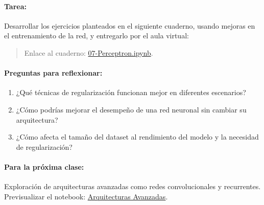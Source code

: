 \documentclass[a4,11pt]{aleph-notas}
\begin{document}
\paragraph{Tarea:}  
    Desarrollar los ejercicios planteados en el siguiente cuaderno, usando mejoras en el entrenamiento de la red, y entregarlo por el aula virtual:
    \begin{quote}
        Enlace al cuaderno: \href{https://colab.research.google.com/github/andres-merino/AprendizajeAutomaticoInicial-05-N0105/blob/main/2-Ejercicios/07-Perceptron.ipynb}{07-Perceptron.ipynb}.
    \end{quote}

\paragraph{Preguntas para reflexionar:}  
\begin{enumerate}[leftmargin=*]  
    \item ¿Qué técnicas de regularización funcionan mejor en diferentes escenarios?  
    \item ¿Cómo podrías mejorar el desempeño de una red neuronal sin cambiar su arquitectura?  
    \item ¿Cómo afecta el tamaño del dataset al rendimiento del modelo y la necesidad de regularización?  
\end{enumerate}  

\paragraph{Para la próxima clase:}  
Exploración de arquitecturas avanzadas como redes convolucionales y recurrentes. Previsualizar el notebook: \href{https://example.com}{Arquitecturas Avanzadas}.
\end{document}
